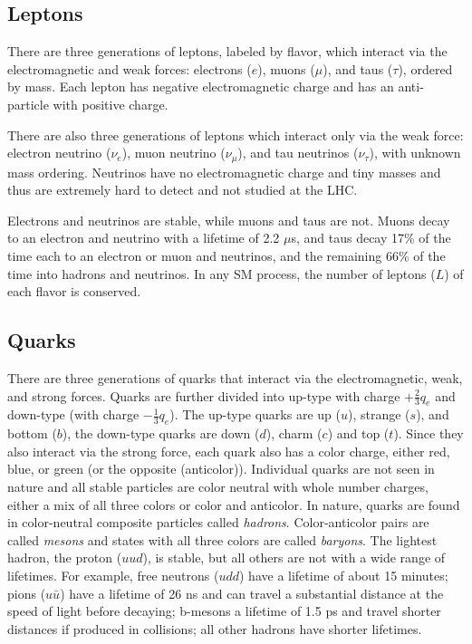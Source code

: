 \subsection{Leptons}
There are three generations of leptons, labeled by flavor, which interact via the electromagnetic and weak forces: electrons ($e$), muons ($\mu$), and taus ($\tau$), ordered by mass. Each lepton has negative electromagnetic charge and has an anti-particle with positive charge. 

There are also three generations of leptons which interact only via the weak force: electron neutrino ($\nu_{e}$), muon neutrino ($\nu_{\mu}$), and tau neutrinos ($\nu_{\tau}$), with unknown mass ordering. Neutrinos have no electromagnetic charge and tiny masses and thus are extremely hard to detect and not studied at the \ac{LHC}. 

Electrons and neutrinos are stable, while muons and taus are not. Muons decay to an electron and neutrino with a lifetime of 2.2 $\mu$s, and taus decay 17\% of the time each to an electron or muon and neutrinos, and the remaining 66\% of the time into hadrons and neutrinos. In any \ac{SM} process, the number of leptons ($L$) of each flavor is conserved. 


\subsection{Quarks}
There are three generations of quarks that interact via the electromagnetic, weak, and strong forces. Quarks are further divided into up-type with charge $+\frac{2}{3}q_{e}$ and down-type (with charge $-\frac{1}{3}q_{e}$). The up-type quarks are up ($u$), strange ($s$), and bottom ($b$), the down-type quarks are down ($d$), charm ($c$) and top ($t$). Since they also interact via the strong force, each quark also has a color charge, either red, blue, or green (or the opposite (anticolor)). Individual quarks are not seen in nature and all stable particles are color neutral with whole number charges, either a mix of all three colors or color and anticolor. In nature, quarks are found in color-neutral composite particles called \emph{hadrons}. Color-anticolor pairs are called \emph{mesons} and states with all three colors are called \emph{baryons}. The lightest hadron, the proton ($uud$), is stable, but all others are not with a wide range of lifetimes. For example, free neutrons ($udd$) have a lifetime of about 15 minutes; pions ($u\bar{u}$) have a lifetime of 26 ns and can travel a substantial distance at the speed of light before decaying; b-mesons a lifetime of 1.5 ps and travel shorter distances if produced in collisions; all other hadrons have shorter lifetimes. 

